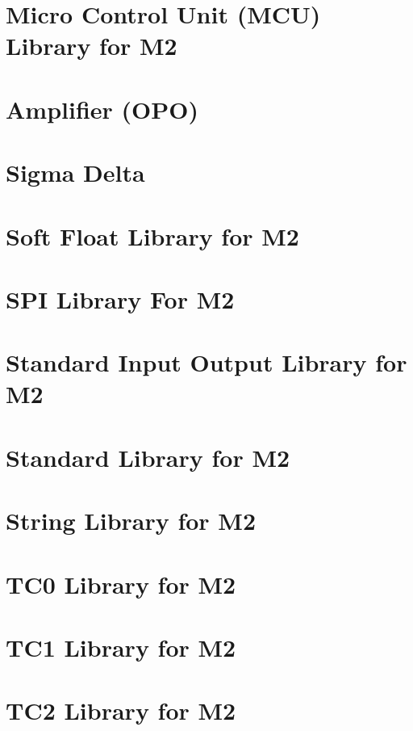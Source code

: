 \documentclass[twoside]{article}
\newcommand{\+}{\discretionary{\mbox{\scriptsize$\hookleftarrow$}}{}{}}
\begin{document}
\section{Micro Control Unit (M\+CU) Library for M2}
\label{a00145}

\section{Amplifier (O\+PO)}
\label{a00146}

\section{Sigma Delta}
\label{a00147}

\section{Soft Float Library for M2}
\label{a00148}

\section{S\+PI Library For M2}
\label{a00149}

\section{Standard Input Output Library for M2}
\label{a00150}

\section{Standard Library for M2}
\label{a00151}

\section{String Library for M2}
\label{a00152}

\section{T\+C0 Library for M2}
\label{a00153}

\section{T\+C1 Library for M2}
\label{a00154}

\section{T\+C2 Library for M2}
\label{a00155}

\end{document}
